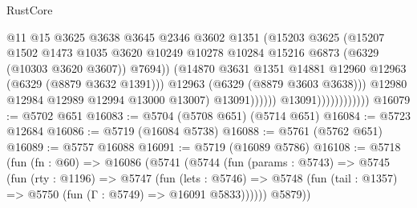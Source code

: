 \begin{lexlean}{RustCore}
\begin{coremodule}
                                            @11
                                            @15
                                            @3625
                                            @3638
                                            @3645
                                            @2346
                                            @3602
                                            @1351
                                            (@15203
                                              @3625
                                              (@15207
                                                @1502
                                                @1473
                                                @1035
                                                @3620
                                                @10249
                                                @10278
                                                @10284
                                                @15216
                                                @6873
                                                (@6329 (@10303 @3620 @3607))
                                                @7694))
                                            (@14870
                                              @3631
                                              @1351
                                              @14881
                                              @12960
                                              @12963
                                              (@6329 (@8879 @3632 @1391)))
                                            @12963
                                            (@6329 (@8879 @3603 @3638)))
                                          @12980
                                          @12984
                                          @12989
                                          @12994
                                          @13000
                                          @13007)
                                        @13091))))))
                            @13091))))))))))))
@16079 := @5702 @651
@16083 := @5704 (@5708 @651) (@5714 @651)
@16084 := @5723 @12684
@16086 := @5719 (@16084 @5738)
@16088 := @5761 (@5762 @651)
@16089 := @5757 @16088
@16091 := @5719 (@16089 @5786)
@16108 := @5718
    (fun (fn : @60) =>
    @16086
      (@5741
        (@5744
          (fun (params : @5743) =>
          @5745
            (fun (rty : @1196) =>
            @5747
              (fun (lets : @5746) =>
              @5748 (fun (tail : @1357) => @5750 (fun (Γ : @5749) => @16091 @5833))))))
        @5879))

\end{coremodule}
\end{lexlean}
